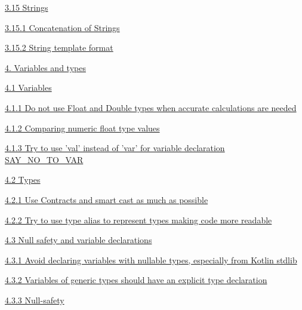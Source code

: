 \hspace{1.0cm}\hyperref[sec:3.15]{ 3.15 Strings}

\hspace{1.0cm}\hyperref[sec:3.15.1]{ 3.15.1 Concatenation of Strings}

\hspace{1.0cm}\hyperref[sec:3.15.2]{ 3.15.2 String template format}

\hspace{0.0cm}\hyperref[sec:]{}

\hspace{0.0cm}\hyperref[sec:4.]{4. Variables and types}

\hspace{0.5cm}\hyperref[sec:4.1]{ 4.1 Variables}

\hspace{1.0cm}\hyperref[sec:4.1.1]{ 4.1.1 Do not use Float and Double types when accurate calculations are needed}

\hspace{1.0cm}\hyperref[sec:4.1.2]{ 4.1.2 Comparing numeric float type values}

\hspace{1.0cm}\hyperref[sec:4.1.3]{ 4.1.3 Try to use 'val' instead of 'var' for variable declaration SAY_NO_TO_VAR}

\hspace{0.5cm}\hyperref[sec:4.2]{ 4.2 Types}

\hspace{1.0cm}\hyperref[sec:4.2.1]{ 4.2.1 Use Contracts and smart cast as much as possible}

\hspace{1.0cm}\hyperref[sec:4.2.2]{ 4.2.2 Try to use type alias to represent types making code more readable}

\hspace{0.5cm}\hyperref[sec:4.3]{ 4.3 Null safety and variable declarations}

\hspace{1.0cm}\hyperref[sec:4.3.1]{ 4.3.1 Avoid declaring variables with nullable types, especially from Kotlin stdlib}

\hspace{1.0cm}\hyperref[sec:4.3.2]{ 4.3.2 Variables of generic types should have an explicit type declaration}

\hspace{1.0cm}\hyperref[sec:4.3.3]{ 4.3.3 Null-safety}

\hspace{0.0cm}\hyperref[sec:]{}

